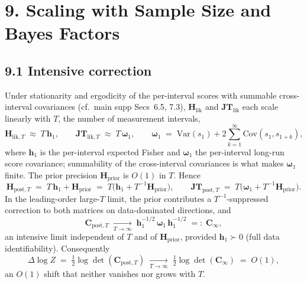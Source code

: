 \documentclass[11pt]{article}
\begin{document}
\section*{9. Scaling with Sample Size and Bayes Factors}

\subsection*{9.1 Intensive correction}

Under stationarity and ergodicity of the per-interval scores with summable cross-interval
covariances (cf.\ main supp Secs~6.5, 7.3), $\mathbf H_{\mathrm{lik}}$ and
$\mathbf{JT}_{\mathrm{lik}}$ each scale linearly with $T$, the number of measurement intervals,
\begin{equation}
\mathbf H_{\mathrm{lik},T} \;\approx\; T\,\mathbf h_1,
\qquad
\mathbf{JT}_{\mathrm{lik},T} \;\approx\; T\,\boldsymbol\omega_1,
\qquad
\boldsymbol\omega_1 \;=\; \mathrm{Var}(s_1) + 2\sum_{k=1}^\infty \mathrm{Cov}(s_1, s_{1+k}),
\label{eq:lik-scaling}
\end{equation}
where $\mathbf h_1$ is the per-interval expected Fisher and $\boldsymbol\omega_1$ the
per-interval long-run score covariance; summability of the cross-interval covariances is
what makes $\boldsymbol\omega_1$ finite. The prior precision $\mathbf H_{\mathrm{prior}}$
is $O(1)$ in $T$. Hence
\begin{equation}
\mathbf H_{\mathrm{post},T}
\;=\;
T\,\mathbf h_1 + \mathbf H_{\mathrm{prior}}
\;=\;
T\bigl(\mathbf h_1 + T^{-1}\mathbf H_{\mathrm{prior}}\bigr),
\qquad
\mathbf{JT}_{\mathrm{post},T}
\;=\;
T\bigl(\boldsymbol\omega_1 + T^{-1}\mathbf H_{\mathrm{prior}}\bigr).
\label{eq:post-scaling}
\end{equation}
In the leading-order large-$T$ limit, the prior contributes a $T^{-1}$-suppressed
correction to both matrices on data-dominated directions, and
\begin{equation}
\mathbf C_{\mathrm{post},T}
\;\xrightarrow[T\to\infty]{}\;
\mathbf h_1^{-1/2}\,\boldsymbol\omega_1\,\mathbf h_1^{-1/2}
\;=:\;
\mathbf C_\infty,
\label{eq:Cpost-asymptote}
\end{equation}
an intensive limit independent of $T$ and of $\mathbf H_{\mathrm{prior}}$, provided
$\mathbf h_1 \succ 0$ (full data identifiability). Consequently
\begin{equation}
\Delta\log Z
\;=\;
\tfrac{1}{2}\log\det(\mathbf C_{\mathrm{post},T})
\;\xrightarrow[T\to\infty]{}\;
\tfrac{1}{2}\log\det(\mathbf C_\infty)
\;=\;
O(1),
\label{eq:DeltaZ-O1}
\end{equation}
an $O(1)$ shift that neither vanishes nor grows with $T$.
\end{document}
